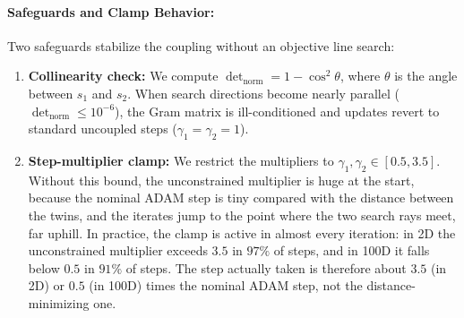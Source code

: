 \documentclass[11pt,a4paper]{article}
\newcommand{\added}[1]{#1}
\begin{document}
\added{\paragraph{Safeguards and Clamp Behavior:}
Two safeguards stabilize the coupling without an objective line search:
\begin{enumerate}
    \item \textbf{Collinearity check:} We compute $\det_{\text{norm}} = 1 - \cos^2\theta$, where $\theta$ is the angle between $s_1$ and $s_2$. When search directions become nearly parallel ($\det_{\text{norm}} \le 10^{-6}$), the Gram matrix is ill-conditioned and updates revert to standard uncoupled steps ($\gamma_1 = \gamma_2 = 1$).
    \item \textbf{Step-multiplier clamp:} We restrict the multipliers to $\gamma_1, \gamma_2 \in [0.5, 3.5]$. Without this bound, the unconstrained multiplier is huge at the start, because the nominal ADAM step is tiny compared with the distance between the twins, and the iterates jump to the point where the two search rays meet, far uphill. In practice, the clamp is active in almost every iteration: in 2D the unconstrained multiplier exceeds $3.5$ in $97\%$ of steps, and in 100D it falls below $0.5$ in $91\%$ of steps. The step actually taken is therefore about $3.5$ (in 2D) or $0.5$ (in 100D) times the nominal ADAM step, not the distance-minimizing one.
\end{enumerate}}
\end{document}
